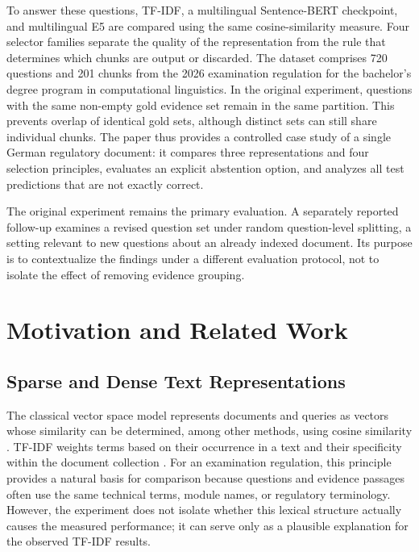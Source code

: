 \documentclass[11pt]{article}
\newcommand{\revision}[1]{{\color{blue}#1}}
\begin{document}
To answer these questions, TF-IDF, a multilingual Sentence-BERT checkpoint, and multilingual E5 are compared using the same cosine-similarity measure. Four selector families separate the quality of the representation from the rule that determines which chunks are output or discarded. The dataset comprises 720 questions and 201 chunks from the 2026 examination regulation for the bachelor's degree program in computational linguistics. \revision{In the original experiment, questions with the same non-empty gold evidence set remain in the same partition. This prevents overlap of identical gold sets, although distinct sets can still share individual chunks.} The paper thus provides a controlled case study of a single German regulatory document: it compares three representations and four selection principles, evaluates an explicit abstention option, and analyzes all test predictions that are not exactly correct.

\revision{The original experiment remains the primary evaluation. A separately reported follow-up examines a revised question set under random question-level splitting, a setting relevant to new questions about an already indexed document. Its purpose is to contextualize the findings under a different evaluation protocol, not to isolate the effect of removing evidence grouping.}


\section{Motivation and Related Work}

\subsection{Sparse and Dense Text Representations}

The classical vector space model represents documents and queries as vectors whose similarity can be determined, among other methods, using cosine similarity \citep{salton1975vector}. TF-IDF weights terms based on their occurrence in a text and their specificity within the document collection \citep{sparckjones1972statistical}. For an examination regulation, this principle provides a natural basis for comparison because questions and evidence passages often use the same technical terms, module names, or regulatory terminology. However, the experiment does not isolate whether this lexical structure actually causes the measured performance; it can serve only as a plausible explanation for the observed TF-IDF results.
\end{document}
